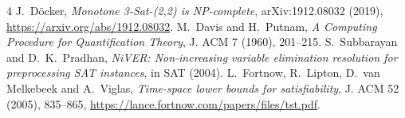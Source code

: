\documentclass[11pt]{article}
\begin{document}
\begin{thebibliography}{4}
 J.~D\"ocker, \emph{Monotone 3-Sat-(2,2) is NP-complete}, arXiv:1912.08032 (2019), \url{https://arxiv.org/abs/1912.08032}.
 M.~Davis and H.~Putnam, \emph{A Computing Procedure for Quantification Theory}, J. ACM 7 (1960), 201--215.
 S.~Subbarayan and D.~K.~Pradhan, \emph{NiVER: Non-increasing variable elimination resolution for preprocessing SAT instances}, in SAT (2004).
 L.~Fortnow, R.~Lipton, D.~van Melkebeek and A.~Viglas, \emph{Time-space lower bounds for satisfiability}, J. ACM 52 (2005), 835--865, \url{https://lance.fortnow.com/papers/files/tst.pdf}.
\end{thebibliography}
\end{document}
